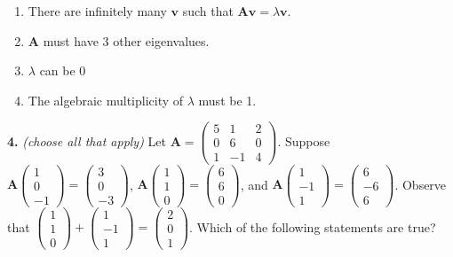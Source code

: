 \documentclass[10pt,a4paper]{article}
\begin{document}
\begin{enumerate}[label=(\Alph*)]
\item There are infinitely many \(\mathbf{v}\) such that \(\mathbf{Av=}\lambda\mathbf{v}\).
\item \(\mathbf{A}\) must have 3 other eigenvalues.
\item \(\lambda\) can be 0
\item The algebraic multiplicity of \(\lambda\) must be 1.
\end{enumerate}
\smallskip
\textbf{4.} \textit{(choose all that apply)} Let \(\mathbf{A}=\begin{pmatrix}5&1&2\\0&6&0\\1&-1&4\end{pmatrix}\). Suppose \(\mathbf{A}\begin{pmatrix}1\\0\\-1\end{pmatrix}=\begin{pmatrix}3\\0\\-3\end{pmatrix}\), \(\mathbf{A}\begin{pmatrix}1\\1\\0\end{pmatrix}=\begin{pmatrix}6\\6\\0\end{pmatrix}\), and \(\mathbf{A}\begin{pmatrix}1\\-1\\1\end{pmatrix}=\begin{pmatrix}6\\-6\\6\end{pmatrix}\). Observe that \(\begin{pmatrix}1\\1\\0\end{pmatrix}+\begin{pmatrix}1\\-1\\1\end{pmatrix}=\begin{pmatrix}2\\0\\1\end{pmatrix}\). Which of the following statements are true?
\end{document}
